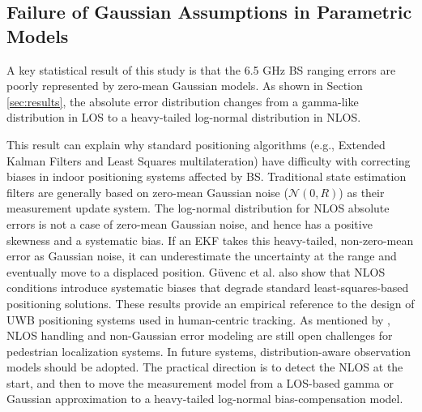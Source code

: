\subsection{Failure of Gaussian Assumptions in Parametric Models}

A key statistical result of this study is that the 6.5 GHz BS ranging errors are poorly represented by zero-mean Gaussian models. As shown in Section \ref{sec:results}, the absolute error distribution changes from a gamma-like distribution in LOS to a heavy-tailed log-normal distribution in NLOS.

This result can explain why standard positioning algorithms (e.g., Extended Kalman Filters and Least Squares multilateration) have difficulty with correcting biases in indoor positioning systems affected by BS. Traditional state estimation filters are generally based on zero-mean Gaussian noise ($\mathcal{N}(0, R)$) as their measurement update system. The log-normal distribution for NLOS absolute errors is not a case of zero-mean Gaussian noise, and hence has a positive skewness and a systematic bias. If an EKF takes this heavy-tailed, non-zero-mean error as Gaussian noise, it can underestimate the uncertainty at the range and eventually move to a displaced position. G\"uvenc et al. also show that NLOS conditions introduce systematic biases that degrade standard least-squares-based positioning solutions. These results provide an empirical reference to the design of UWB positioning systems used in human-centric tracking. As mentioned by \cite{Mirama2021}, NLOS handling and non-Gaussian error modeling are still open challenges for pedestrian localization systems. In future systems, distribution-aware observation models should be adopted. The practical direction is to detect the NLOS at the start, and then to move the measurement model from a LOS-based gamma or Gaussian approximation to a heavy-tailed log-normal bias-compensation model.

